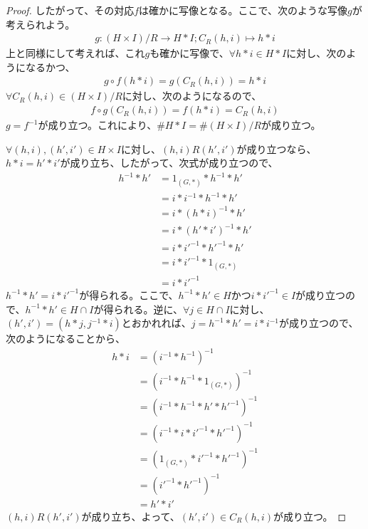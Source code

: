 \documentclass[dvipdfmx]{jsarticle}
\begin{document}
\begin{proof}
したがって、その対応$f$は確かに写像となる。ここで、次のような写像$g$が考えられよう。
\begin{align*}
g:{(H \times I)}/{R} \rightarrow H*I;C_{R}(h,i) \mapsto h*i
\end{align*}
上と同様にして考えれば、これ$g$も確かに写像で、$\forall h*i \in H*I$に対し、次のようになるかつ、
\begin{align*}
g \circ f(h*i) = g\left( C_{R}(h,i) \right) = h*i
\end{align*}
$\forall C_{R}(h,i) \in {(H \times I)}/{R}$に対し、次のようになるので、
\begin{align*}
f \circ g\left( C_{R}(h,i) \right) = f(h*i) = C_{R}(h,i)
\end{align*}
$g = f^{- 1}$が成り立つ。これにより、$\#{H*I} = \#{(H \times I)}/{R}$が成り立つ。\par
$\forall(h,i),\left( h',i' \right) \in H \times I$に対し、$(h,i)R\left( h',i' \right)$が成り立つなら、$h*i = h'*i'$が成り立ち、したがって、次式が成り立つので、
\begin{align*}
h^{- 1}*h' &= 1_{(G,*)}*h^{- 1}*h'\\
&= i*i^{- 1}*h^{- 1}*h'\\
&= i*(h*i)^{- 1}*h'\\
&= i*\left( h'*i' \right)^{- 1}*h'\\
&= i*{i'}^{- 1}*{h'}^{- 1}*h'\\
&= i*{i'}^{- 1}*1_{(G,*)}\\
&= i*{i'}^{- 1}
\end{align*}
$h^{- 1}*h' = i*{i'}^{- 1}$が得られる。ここで、$h^{- 1}*h' \in H$かつ$i*{i'}^{- 1} \in I$が成り立つので、$h^{- 1}*h' \in H \cap I$が得られる。逆に、$\forall j \in H \cap I$に対し、$\left( h',i' \right) = \left( h*j,j^{- 1}*i \right)$とおかれれば、$j = h^{- 1}*h' = i*i^{- 1}$が成り立つので、次のようになることから、
\begin{align*}
h*i &= \left( i^{- 1}*h^{- 1} \right)^{- 1}\\
&= \left( i^{- 1}*h^{- 1}*1_{(G,*)} \right)^{- 1}\\
&= \left( i^{- 1}*h^{- 1}*h'*{h'}^{- 1} \right)^{- 1}\\
&= \left( i^{- 1}*i*{i'}^{- 1}*{h'}^{- 1} \right)^{- 1}\\
&= \left( 1_{(G,*)}*{i'}^{- 1}*{h'}^{- 1} \right)^{- 1}\\
&= \left( {i'}^{- 1}*{h'}^{- 1} \right)^{- 1}\\
&= h'*i'
\end{align*}
$(h,i)R\left( h',i' \right)$が成り立ち、よって、$\left( h',i' \right) \in C_{R}(h,i)$が成り立つ。\par

\end{proof}
\end{document}
